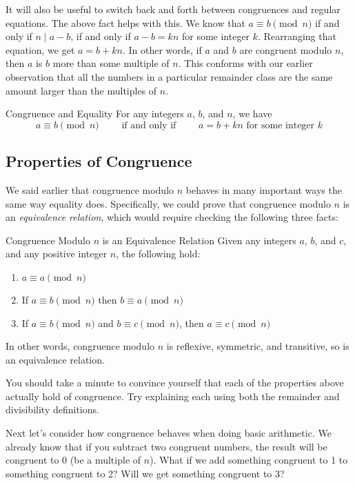 \documentclass[12pt]{article}
\begin{document}
It will also be useful to switch back and forth between congruences and regular equations.  The above fact helps with this.  We know that $a \equiv b \pmod{n}$ if and only if $n \mid a-b$, if and only if $a-b = kn$ for some integer $k$.  Rearranging that equation, we get $a = b + kn$.  In other words, if $a$ and $b$ are congruent modulo $n$, then $a$ is $b$ more than some multiple of $n$.  This conforms with our earlier observation that all the numbers in a particular remainder class are the same amount larger than the multiples of $n$.

\begin{defbox}{Congruence and Equality}
	For any integers $a$, $b$, and $n$, we have
	\[a \equiv b \pmod{n} \qquad \mbox{ if and only if } \qquad a = b + kn \mbox{ for some integer $k$}\]
\end{defbox}

\subsection{Properties of Congruence}

We said earlier that congruence modulo $n$ behaves in many important ways the same way equality does.  Specifically, we could prove that congruence modulo $n$ is an {\em equivalence relation}, which would require checking the following three facts:

\begin{defbox}{Congruence Modulo $n$ is an Equivalence Relation}
	Given any integers $a$, $b$, and $c$, and any positive integer $n$, the following hold:
	\begin{enumerate}
		\item $a \equiv a \pmod{n}$ 
		\item If $a \equiv b \pmod{n}$ then $b \equiv a \pmod{n}$
		\item If $a \equiv b \pmod{n}$ and $b \equiv c \pmod{n}$, then $a \equiv c \pmod{n}$ 
	\end{enumerate}
	In other words, congruence modulo $n$ is reflexive, symmetric, and transitive, so is an equivalence relation.
\end{defbox}

You should take a minute to convince yourself that each of the properties above actually hold of congruence.  Try explaining each using both the remainder and divisibility definitions.

Next let's consider how congruence behaves when doing basic arithmetic.  We already know that if you subtract two congruent numbers, the result will be congruent to 0 (be a multiple of $n$).  What if we add something congruent to 1 to something congruent to 2?  Will we get something congruent to 3?  
\end{document}
